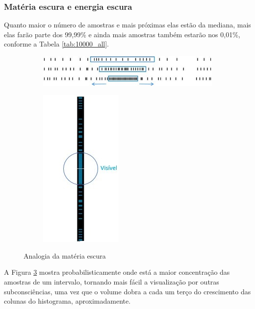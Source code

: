 \subsubsection{Matéria escura e energia escura}
Quanto maior o número de amostras e mais próximas elas estão da mediana, mais elas farão parte dos 99,99\% e ainda mais amostras também estarão nos 0,01\%, conforme a Tabela \ref{tab:10000_all}.
\begin{figure}[H]
\centering
	\begin{subfigure}[H]{1\linewidth}
	\centering
	\includegraphics[width=.96\linewidth]{sections/images/consciousness_dark_matter_dark_energy.jpg}
	\caption{}
	\label{fig:consciousness_dark_matter_dark_energy}
	\end{subfigure}
\hfill
	\begin{subfigure}[H]{0.7\linewidth}
	\centering
	\includegraphics[width=.3\linewidth]{sections/images/consciousness_dark_matter_dark_energy_wave.jpg}
	\caption{}
	\label{fig:consciousness_dark_matter_dark_energy_wave}
	\end{subfigure}%
\caption{Analogia da matéria escura}
\end{figure}

A Figura \ref{fig:consciousness_dark_matter_dark_energy_wave} mostra probabilisticamente onde está a maior concentração das amostras de um intervalo, tornando mais fácil a visualização por outras subconsciências, uma vez que o volume dobra a cada um terço do crescimento das colunas do histograma, aproximadamente.

